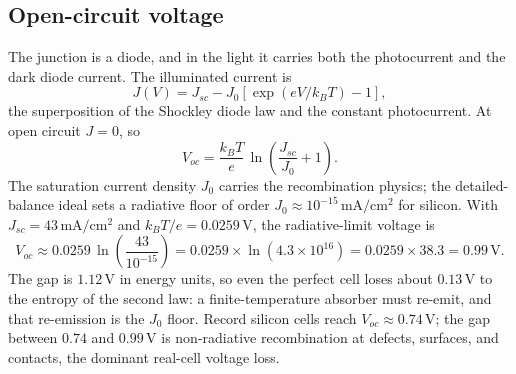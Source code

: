 \subsection{Open-circuit voltage}

The junction is a diode, and in the light it carries both the
photocurrent and the dark diode current. The illuminated current is
\[
J(V) = J_{sc} - J_{0}\left[\exp(eV/k_{B}T) - 1\right],
\]
the superposition of the Shockley diode law and the constant
photocurrent. At open circuit $J = 0$, so
\[
V_{oc} = \frac{k_{B}T}{e}\,\ln\!\left(\frac{J_{sc}}{J_{0}} + 1\right).
\]
The saturation current density $J_{0}$ carries the recombination
physics; the detailed-balance ideal sets a radiative floor of order
$J_{0} \approx 10^{-15}\,\si{\milli\ampere\per\centi\meter\squared}$
for silicon. With $J_{sc} = 43\,\si{\milli\ampere\per\centi\meter
\squared}$ and $k_{B}T/e = 0.0259\,\si{\volt}$, the radiative-limit
voltage is
\[
V_{oc} \approx 0.0259\,\ln\!\left(\frac{43}{10^{-15}}\right)
= 0.0259 \times \ln(4.3\times 10^{16}) = 0.0259 \times 38.3
= 0.99\,\si{\volt}.
\]
The gap is $1.12\,\si{\volt}$ in energy units, so even the perfect cell
loses about $0.13\,\si{\volt}$ to the entropy of the second law: a
finite-temperature absorber must re-emit, and that re-emission is the
$J_{0}$ floor. Record silicon cells reach $V_{oc} \approx 0.74\,\si{
\volt}$; the gap between $0.74$ and $0.99\,\si{\volt}$ is non-radiative
recombination at defects, surfaces, and contacts, the dominant
real-cell voltage loss.


